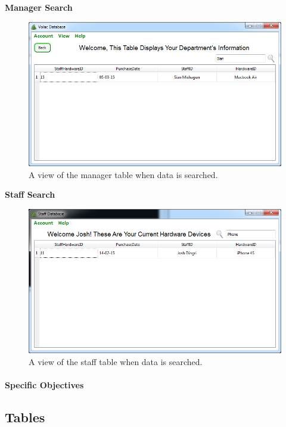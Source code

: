 \textbf{Manager Search}

\begin{figure}[H]
    \includegraphics[width=\textwidth]{./Evaluation/Images/managersearch.png}
    \caption{A view of the manager table when data is searched.} 
\end{figure}

\textbf{Staff Search}

\begin{figure}[H]
    \includegraphics[width=\textwidth]{./Evaluation/Images/staffsearch.png}
    \caption{A view of the staff table when data is searched.} 
\end{figure}

\paragraph{Specific Objectives}

\subsection{Tables}

